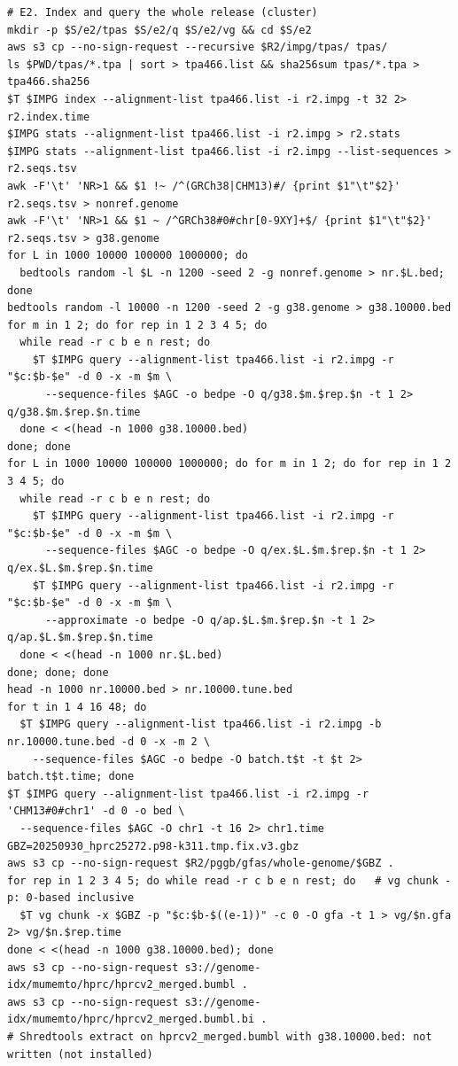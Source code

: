 {\begin{verbatim}
# E2. Index and query the whole release (cluster)
mkdir -p $S/e2/tpas $S/e2/q $S/e2/vg && cd $S/e2
aws s3 cp --no-sign-request --recursive $R2/impg/tpas/ tpas/
ls $PWD/tpas/*.tpa | sort > tpa466.list && sha256sum tpas/*.tpa > tpa466.sha256
$T $IMPG index --alignment-list tpa466.list -i r2.impg -t 32 2> r2.index.time
$IMPG stats --alignment-list tpa466.list -i r2.impg > r2.stats
$IMPG stats --alignment-list tpa466.list -i r2.impg --list-sequences > r2.seqs.tsv
awk -F'\t' 'NR>1 && $1 !~ /^(GRCh38|CHM13)#/ {print $1"\t"$2}' r2.seqs.tsv > nonref.genome
awk -F'\t' 'NR>1 && $1 ~ /^GRCh38#0#chr[0-9XY]+$/ {print $1"\t"$2}' r2.seqs.tsv > g38.genome
for L in 1000 10000 100000 1000000; do
  bedtools random -l $L -n 1200 -seed 2 -g nonref.genome > nr.$L.bed; done
bedtools random -l 10000 -n 1200 -seed 2 -g g38.genome > g38.10000.bed
for m in 1 2; do for rep in 1 2 3 4 5; do
  while read -r c b e n rest; do
    $T $IMPG query --alignment-list tpa466.list -i r2.impg -r "$c:$b-$e" -d 0 -x -m $m \
      --sequence-files $AGC -o bedpe -O q/g38.$m.$rep.$n -t 1 2> q/g38.$m.$rep.$n.time
  done < <(head -n 1000 g38.10000.bed)
done; done
for L in 1000 10000 100000 1000000; do for m in 1 2; do for rep in 1 2 3 4 5; do
  while read -r c b e n rest; do
    $T $IMPG query --alignment-list tpa466.list -i r2.impg -r "$c:$b-$e" -d 0 -x -m $m \
      --sequence-files $AGC -o bedpe -O q/ex.$L.$m.$rep.$n -t 1 2> q/ex.$L.$m.$rep.$n.time
    $T $IMPG query --alignment-list tpa466.list -i r2.impg -r "$c:$b-$e" -d 0 -x -m $m \
      --approximate -o bedpe -O q/ap.$L.$m.$rep.$n -t 1 2> q/ap.$L.$m.$rep.$n.time
  done < <(head -n 1000 nr.$L.bed)
done; done; done
head -n 1000 nr.10000.bed > nr.10000.tune.bed
for t in 1 4 16 48; do
  $T $IMPG query --alignment-list tpa466.list -i r2.impg -b nr.10000.tune.bed -d 0 -x -m 2 \
    --sequence-files $AGC -o bedpe -O batch.t$t -t $t 2> batch.t$t.time; done
$T $IMPG query --alignment-list tpa466.list -i r2.impg -r 'CHM13#0#chr1' -d 0 -o bed \
  --sequence-files $AGC -O chr1 -t 16 2> chr1.time
GBZ=20250930_hprc25272.p98-k311.tmp.fix.v3.gbz
aws s3 cp --no-sign-request $R2/pggb/gfas/whole-genome/$GBZ .
for rep in 1 2 3 4 5; do while read -r c b e n rest; do   # vg chunk -p: 0-based inclusive
  $T vg chunk -x $GBZ -p "$c:$b-$((e-1))" -c 0 -O gfa -t 1 > vg/$n.gfa 2> vg/$n.$rep.time
done < <(head -n 1000 g38.10000.bed); done
aws s3 cp --no-sign-request s3://genome-idx/mumemto/hprc/hprcv2_merged.bumbl .
aws s3 cp --no-sign-request s3://genome-idx/mumemto/hprc/hprcv2_merged.bumbl.bi .
# Shredtools extract on hprcv2_merged.bumbl with g38.10000.bed: not written (not installed)


\end{verbatim}}
